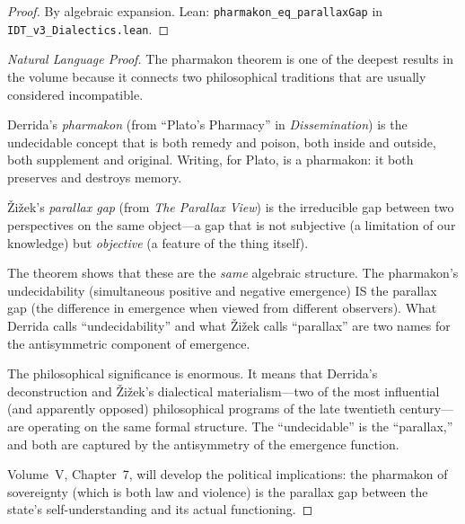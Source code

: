 \begin{proof}
By algebraic expansion. Lean: \texttt{pharmakon\_eq\_parallaxGap} in
\texttt{IDT\_v3\_Dialectics.lean}.
\end{proof}

\begin{proof}[Natural Language Proof]
The pharmakon theorem is one of the deepest results in the volume because it
connects two philosophical traditions that are usually considered incompatible.

Derrida's \textit{pharmakon} (from ``Plato's Pharmacy'' in
\textit{Dissemination}) is the undecidable concept that is both remedy and
poison, both inside and outside, both supplement and original. Writing, for
Plato, is a pharmakon: it both preserves and destroys memory.

\v{Z}i\v{z}ek's \textit{parallax gap} (from \textit{The Parallax View}) is
the irreducible gap between two perspectives on the same object---a gap that
is not subjective (a limitation of our knowledge) but \emph{objective} (a
feature of the thing itself).

The theorem shows that these are the \emph{same} algebraic structure. The
pharmakon's undecidability (simultaneous positive and negative emergence) IS
the parallax gap (the difference in emergence when viewed from different
observers). What Derrida calls ``undecidability'' and what \v{Z}i\v{z}ek
calls ``parallax'' are two names for the antisymmetric component of emergence.

The philosophical significance is enormous. It means that Derrida's
deconstruction and \v{Z}i\v{z}ek's dialectical materialism---two of the most
influential (and apparently opposed) philosophical programs of the late
twentieth century---are operating on the same formal structure. The
``undecidable'' is the ``parallax,'' and both are captured by the antisymmetry
of the emergence function.

Volume~V, Chapter~7, will develop the political implications: the pharmakon
of sovereignty (which is both law and violence) is the parallax gap between
the state's self-understanding and its actual functioning.
\end{proof}

